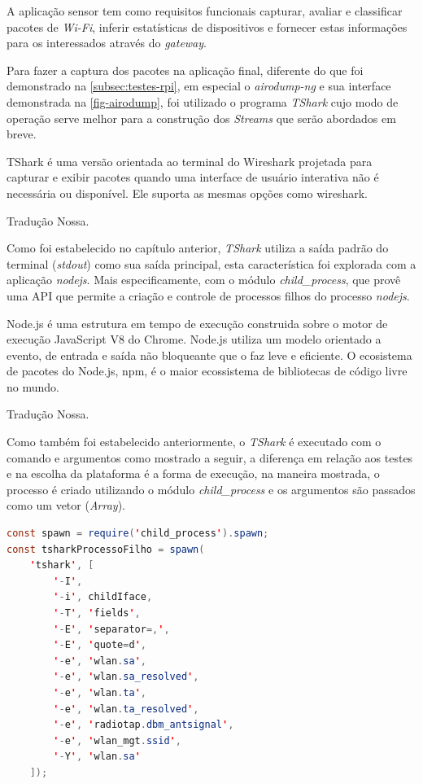 A aplicação sensor tem como requisitos funcionais capturar, avaliar e classificar pacotes de
\emph{Wi-Fi}, inferir estatísticas de dispositivos e fornecer estas informações para
os interessados através do \emph{gateway}.

Para fazer a captura dos pacotes na aplicação final, diferente do que foi
demonstrado na \autoref{subsec:testes-rpi}, em especial o \emph{airodump-ng} e
sua interface demonstrada na \autoref{fig-airodump}, foi utilizado o programa
\emph{TShark} cujo modo de operação serve melhor para a construção dos
\emph{Streams} que serão abordados em breve.

\begin{citacao}

	TShark é uma versão orientada ao terminal do Wireshark projetada para capturar
	e exibir pacotes quando uma interface de usuário interativa não é necessária ou
	disponível. Ele suporta as mesmas opções como wireshark. \

	 Tradução Nossa.
\end{citacao}

Como foi estabelecido no capítulo anterior, \emph{TShark}  utiliza a saída
padrão  do terminal (\emph{stdout}) como sua saída principal, esta
característica foi explorada com a aplicação \emph{nodejs}. Mais especificamente,
com o módulo \emph{child\_process},  que provê uma API que permite a criação e
controle de processos filhos do processo \emph{nodejs}.

\begin{citacao}

	Node.js é uma estrutura em tempo de execução construida sobre o motor de
	execução JavaScript V8 do Chrome. Node.js utiliza um modelo orientado a
	evento, de entrada e saída não bloqueante que o faz leve e eficiente.
	O ecosistema de pacotes do Node.js, npm, é o maior ecossistema de bibliotecas
	de código livre no mundo. \

	 Tradução Nossa.
\end{citacao}

Como também foi estabelecido anteriormente, o \emph{TShark} é executado com o
comando e argumentos como mostrado a seguir, a diferença em relação aos testes e
na escolha da plataforma é a forma de execução, na maneira mostrada, o processo é
criado utilizando o módulo \emph{child\_process} \cite{child_process} e os
argumentos são passados como um vetor (\emph{Array}).

\begin{lstlisting}[language=java]
const spawn = require('child_process').spawn;
const tsharkProcessoFilho = spawn(
	'tshark', [
		'-I',
		'-i', childIface,
		'-T', 'fields',
		'-E', 'separator=,',
		'-E', 'quote=d',
		'-e', 'wlan.sa',
		'-e', 'wlan.sa_resolved',
		'-e', 'wlan.ta',
		'-e', 'wlan.ta_resolved',
		'-e', 'radiotap.dbm_antsignal',
		'-e', 'wlan_mgt.ssid',
		'-Y', 'wlan.sa'
	]);
\end{lstlisting}

